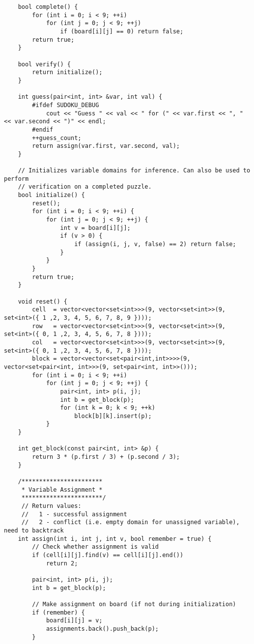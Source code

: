 \documentclass{article}
\begin{document}
\begin{lstlisting}
    bool complete() {
        for (int i = 0; i < 9; ++i)
            for (int j = 0; j < 9; ++j)
                if (board[i][j] == 0) return false;
        return true;
    }
    
    bool verify() {
        return initialize();
    }

    int guess(pair<int, int> &var, int val) {
        #ifdef SUDOKU_DEBUG
            cout << "Guess " << val << " for (" << var.first << ", " << var.second << ")" << endl;
        #endif
        ++guess_count;
        return assign(var.first, var.second, val);
    }

    // Initializes variable domains for inference. Can also be used to perform
    // verification on a completed puzzle.
    bool initialize() {
        reset();
        for (int i = 0; i < 9; ++i) {
            for (int j = 0; j < 9; ++j) {
                int v = board[i][j];
                if (v > 0) {
                    if (assign(i, j, v, false) == 2) return false;
                }
            }
        }
        return true;
    }

    void reset() {
        cell  = vector<vector<set<int>>>(9, vector<set<int>>(9, set<int>({ 1 ,2, 3, 4, 5, 6, 7, 8, 9 })));
        row   = vector<vector<set<int>>>(9, vector<set<int>>(9, set<int>({ 0, 1 ,2, 3, 4, 5, 6, 7, 8 })));
        col   = vector<vector<set<int>>>(9, vector<set<int>>(9, set<int>({ 0, 1 ,2, 3, 4, 5, 6, 7, 8 })));
        block = vector<vector<set<pair<int,int>>>>(9, vector<set<pair<int, int>>>(9, set<pair<int, int>>()));
        for (int i = 0; i < 9; ++i)
            for (int j = 0; j < 9; ++j) {
                pair<int, int> p(i, j);
                int b = get_block(p);
                for (int k = 0; k < 9; ++k)
                    block[b][k].insert(p);
            }
    }

    int get_block(const pair<int, int> &p) {
        return 3 * (p.first / 3) + (p.second / 3);
    }

    /***********************
     * Variable Assignment *
     ***********************/
     // Return values:
     //   1 - successful assignment
     //   2 - conflict (i.e. empty domain for unassigned variable), need to backtrack
    int assign(int i, int j, int v, bool remember = true) {
        // Check whether assignment is valid
        if (cell[i][j].find(v) == cell[i][j].end())
            return 2;

        pair<int, int> p(i, j);
        int b = get_block(p);

        // Make assignment on board (if not during initialization)
        if (remember) {
            board[i][j] = v;
            assignments.back().push_back(p);
        }


\end{lstlisting}
\end{document}
